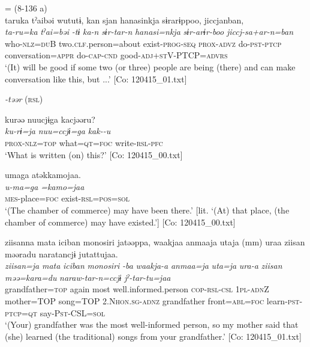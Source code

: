   \ex{} = (8-136 a)\\
     \glll      taruka  tˀaibəi  wututɨ,  kan   sjan  hanasinkja  sɨrarɨppoo,  jiccjanban,\\
      \textit{ta-ru=ka}  \textit{tˀai=bəi}  \textit{-tɨ}  \textit{ka-n} \textit{sɨr-tar-n}  \textit{hanasi=nkja}  \textit{sɨr-arɨr-boo}  \textit{jiccj-sa+ar-n=ban}\\
      who-\textsc{nlz}=\textsc{du}B  two.\textsc{clf}.person=about  exist-\textsc{prog}-\textsc{seq}  \textsc{prox}-\textsc{advz}   do-\textsc{pst}-\textsc{ptcp}  conversation=\textsc{appr}  do-\textsc{cap}-\textsc{cnd}  good-\textsc{adj}+\textsc{st}V-PTCP=\textsc{advrs}   \\
      \glt       ‘(It) will be good if some two (or three) people are being (there) and can make conversation like this, but ...’ [Co: 120415\_01.txt]

\exi{} \textit{{}-təər} (\textsc{rsl})

\ex \label{ex:9.9c} %
     \glll     kurəə  nuucjɨga  kacjəəru?\\
      \textit{ku-rɨ=ja}  \textit{nuu=ccjɨ=ga}  \textit{kak--u}\\
      \textsc{prox}-\textsc{nlz}=\textsc{top}  what=\textsc{qt}=\textsc{foc}  write-\textsc{rsl}-\textsc{pfc}\\
      \glt       ‘What is written (on) this?’ [Co: 120415\_00.txt]

\ex \label{ex:9.9d} %
      \glll  umaga  atəkkamojaa.\\
      \textit{u-ma=ga}  \textit{=kamo=jaa}\\
      \textsc{mes}-place=\textsc{foc}  exist-\textsc{rsl}=\textsc{pos}=\textsc{sol}\\
      \glt       ‘(The chamber of commerce) may have been there.’ [lit. ‘(At) that place, (the chamber of commerce) may have existed.’] [Co: 120415\_00.txt]

\ex \label{9.9e} %
      \glll ziisanna  mata  {\textbar}iciban  monosiri{\textbar}  jatəəppa,  waakjaa  anmaaja  utaja  (mm)  uraa  ziisan  məəradu  naratancjɨ  jutattujaa.\\
      \textit{ziisan=ja}  \textit{mata}  \textit{iciban}  \textit{monosiri}  \textit{-ba}  \textit{waakja-a}  \textit{anmaa=ja}  \textit{uta=ja}    \textit{ura-a}   \textit{ziisan} \textit{məə=kara=du}  \textit{naraw-tar-n=ccjɨ}  \textit{jˀ-tar-tu=jaa}\\
      grandfather=\textsc{top}  again  most  well.informed.person  \textsc{cop}-\textsc{rsl}-\textsc{csl}  1\textsc{pl}-\textsc{adn}Z  mother=TOP  song=TOP    2.N\textsc{hon}.\textsc{sg}-\textsc{adnz}   grandfather  front=\textsc{abl}=\textsc{foc}  learn-\textsc{pst}-\textsc{ptcp}=\textsc{qt}  say-P\textsc{st}-CSL=\textsc{sol}\\
      \glt  ‘(Your) grandfather was the most well-informed person, so my mother said that (she) learned (the traditional) songs from your grandfather.’ [Co: 120415\_01.txt]
    \z
\z

